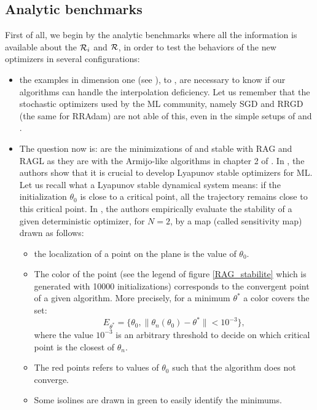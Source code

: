 \subsection{Analytic benchmarks}
\label{test_analytic}

First of all, we begin by the analytic benchmarks where all the information is available about the $\mathcal{R}_i$ and $\mathcal{R}$, in order to test the behaviors of the new optimizers in several configurations:
\begin{itemize}
  \item the examples in dimension one (see \cite{partI}), \exOne to \exHeight, are necessary to know if our algorithms can handle the interpolation deficiency. Let us remember that the stochastic optimizers used by the ML community, namely SGD and RRGD (the same for RRAdam) are not able of this, even in the simple setups of \exOne and \exTwo. 
	\item The question now is: are the minimizations of \polyTwo and \polyThree stable with RAG and RAGL as they are with the Armijo-like algorithms in chapter 2 of \cite{Bilel_thesis}. In \cite{Bilel}, the authors show that it is crucial to develop Lyapunov stable optimizers for ML. Let us recall what a Lyapunov stable dynamical system means: if the initialization $\theta_0$ is close to a critical point, all the trajectory remains close to this critical point. In \cite{Bilel}, the authors empirically evaluate the stability of a given deterministic optimizer, for $N=2$, by a map (called sensitivity map) drawn as follows:
	\begin{itemize}
		\item the localization of a point on the plane is the value of $\theta_0$.
		\item The color of the point (see the legend of figure \ref{RAG_stabilite} which is generated with 10000 initializations) corresponds to the convergent point of a given algorithm. More precisely, for a minimum $\theta^*$ a color covers the set:
		\begin{equation*}
			E_{\theta^*} = \{ \theta_0, \|\theta_n(\theta_0)-\theta^*\| < 10^{-3} \},
		\end{equation*}
		where the value $10^{-3}$ is an arbitrary threshold to decide on which critical point is the closest of $\theta_n$.
		\item The red points refers to values of $\theta_0$ such that the algorithm does not converge.
		\item Some isolines are drawn in green to easily identify the minimums.
	\end{itemize}

\end{itemize}
